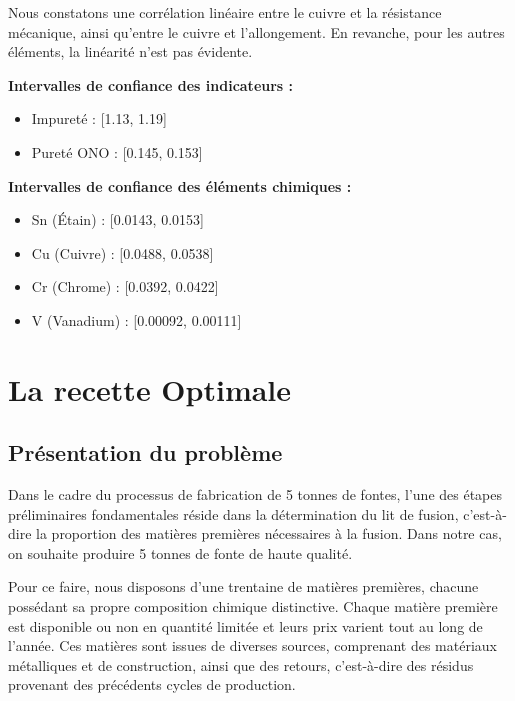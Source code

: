 \documentclass[12pt]{article}
\begin{document}

Nous constatons une corrélation linéaire entre le cuivre et la résistance mécanique, ainsi qu'entre le cuivre et l'allongement. En revanche, pour les autres éléments, la linéarité n'est pas  évidente.



\textbf{Intervalles de confiance des indicateurs :}
\begin{itemize}
\item Impureté : [1.13, 1.19]
\item Pureté ONO : [0.145, 0.153]
\end{itemize}

\textbf{Intervalles de confiance des éléments chimiques :}
\begin{itemize}
\item Sn (Étain) : [0.0143, 0.0153]
\item Cu (Cuivre) : [0.0488, 0.0538]
\item Cr (Chrome) : [0.0392, 0.0422]
\item V (Vanadium) : [0.00092, 0.00111]
\end{itemize}















\section{La recette Optimale}

\subsection{Présentation du problème}

Dans le cadre du processus de fabrication de 5 tonnes de fontes, l'une des
étapes préliminaires fondamentales réside dans la détermination du lit de
fusion, c'est-à-dire la proportion des matières premières nécessaires à la 
fusion. Dans notre cas, on souhaite produire 5 tonnes de fonte de haute 
qualité.

Pour ce faire, nous disposons d'une trentaine de matières premières, 
chacune possédant sa propre composition chimique distinctive. Chaque 
matière première est disponible ou non en quantité limitée et leurs prix 
varient tout au long de l'année. Ces matières sont issues de diverses 
sources, comprenant des matériaux métalliques et de construction, ainsi 
que des retours, c'est-à-dire des résidus provenant des précédents cycles 
de production.
\end{document}
